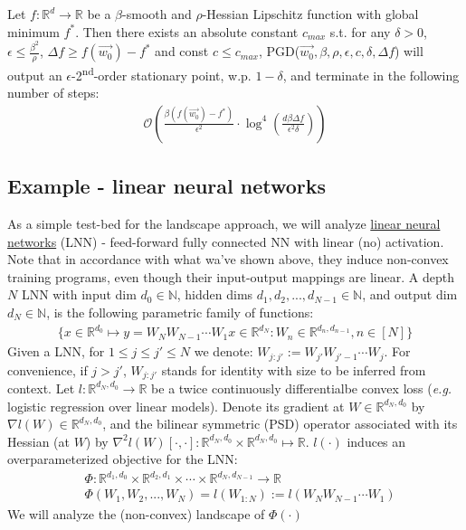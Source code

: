 \documentclass[12pt]{article}
\newcommand{\eg}{{\it e.g. }}
\begin{document}
	\begin{theorem}
	\label{thm:PGD outputs epsilon-2nd-order-stationary point}
		Let $f:\mathbb{R}^d\to\mathbb{R}$ be a $\beta$-smooth and $\rho$-Hessian Lipschitz function with global minimum $f^\ast$. Then there exists an absolute constant $c_{max}$ s.t. for any $\delta>0$, $\epsilon \leq \frac{\beta^2}{\rho}$, $\Delta f \geq  f(\overrightarrow{w_0})-f^\ast$ and const $c \leq c_{max}$, PGD($\overrightarrow{w_0}, \beta, \rho, \epsilon, c, \delta, \Delta{f}$) will output an $\epsilon$-2\textsuperscript{nd}-order stationary point, w.p. $1-\delta$, and terminate in the following number of steps:
	    \begin{align*}
            \mathcal{O}\left(\frac{\beta(f(\overrightarrow{w_0})-f^\ast)}{\epsilon^2} \cdot \log^4({\frac{d \beta \Delta f}{\epsilon^2 \delta}})\right)
	    \end{align*}
	\end{theorem}
	\subsection{Example - linear neural networks}
	As a simple test-bed for the landscape approach, we will analyze \underline{linear neural networks} (LNN) - feed-forward fully connected NN with linear (no) activation. Note that in accordance with what wa've shown above, they induce non-convex training programs, even though their input-output mappings are linear.
	\newline
	A depth $N$ LNN with input dim $d_0 \in \mathbb{N}$, hidden dims $d_1, d_2, ..., d_{N-1} \in \mathbb{N}$, and output dim $d_N \in \mathbb{N}$, is the following parametric family of functions:
    \begin{align*}
        \{x \in \mathbb{R}^{d_0} \mapsto y = W_N W_{N-1} \cdots W_1 x \in \mathbb{R}^{d_N} : W_n \in \mathbb{R}^{d_n, d_{n-1}}, n\in [N]\}
    \end{align*}
    Given a LNN, for $1 \leq j \leq j' \leq N$ we denote: $W_{j:j'}:=W_{j'}W_{j'-1}\cdots W_j$. For convenience, if $j>j'$, $W_{j:j'}$  stands for identity with size to be inferred from context.
    \newline
    Let $l:\mathbb{R}^{d_N, d_0} \to \mathbb{R}$ be a twice continuously differentialbe convex loss (\eg logistic regression over linear models). Denote its gradient at $W \in \mathbb{R}^{d_N,d_0}$ by $\nabla{l(W)} \in \mathbb{R}^{d_N,d_0}$, and the bilinear symmetric (PSD) operator associated with its Hessian (at $W$) by $\nabla^2l(W)[\cdot , \cdot ] : \mathbb{R}^{d_N,d_0} \times \mathbb{R}^{d_N,d_0} \mapsto \mathbb{R}$. $l(\cdot)$ induces an overparameterized objective for the LNN:
    \begin{align} \label{def-of-phi}
        & \Phi : \mathbb{R}^{d_1,d_0} \times \mathbb{R}^{d_2,d_1} \times \cdots \times \mathbb{R}^{d_N,d_{N-1}} \to \mathbb{R} \nonumber\\ &
        \Phi(W_1,W_2,...,W_N) = l(W_{1:N}):=l(W_NW_{N-1} \cdots W_1)
    \end{align}
    We will analyze the (non-convex) landscape of $\Phi(\cdot)$
\end{document}
